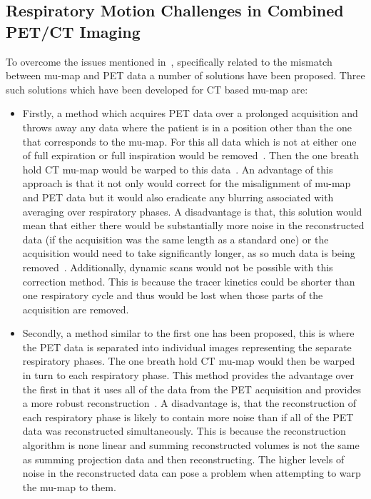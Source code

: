         \subsection{Respiratory Motion Challenges in Combined PET/CT Imaging} \label{sec:respiratory_motion_challenges_in_combined_pet_ct_imaging}
            To overcome the issues mentioned in~, specifically related to the mismatch between \gls{mu-map} and \gls{PET} data a number of solutions have been proposed. Three such solutions which have been developed for \gls{CT} based \gls{mu-map} are:
            
            \begin{itemize}
                \item Firstly, a method which acquires \gls{PET} data over a prolonged acquisition and throws away any data where the patient is in a position other than the one that corresponds to the \gls{mu-map}. For this all data which is not at either one of full expiration or full inspiration would be removed~. Then the one breath hold \gls{CT} \gls{mu-map} would be warped to this data~. An advantage of this approach is that it not only would correct for the misalignment of \gls{mu-map} and \gls{PET} data but it would also eradicate any blurring associated with averaging over respiratory phases. A disadvantage is that, this solution would mean that either there would be substantially more noise in the reconstructed data (if the acquisition was the same length as a standard one) or the acquisition would need to take significantly longer, as so much data is being removed~. Additionally, dynamic scans would not be possible with this correction method. This is because the tracer kinetics could be shorter than one respiratory cycle and thus would be lost when those parts of the acquisition are removed.
                
                \item Secondly, a method similar to the first one has been proposed, this is where the \gls{PET} data is separated into individual images representing the separate respiratory phases. The one breath hold \gls{CT} \gls{mu-map} would then be warped in turn to each respiratory phase. This method provides the advantage over the first in that it uses all of the data from the \gls{PET} acquisition and provides a more robust reconstruction~. A disadvantage is, that the reconstruction of each respiratory phase is likely to contain more noise than if all of the \gls{PET} data was reconstructed simultaneously. This is because the reconstruction algorithm is none linear and summing reconstructed volumes is not the same as summing projection data and then reconstructing. The higher levels of noise in the reconstructed data can pose a problem when attempting to warp the \gls{mu-map} to them.
                

\end{itemize}
